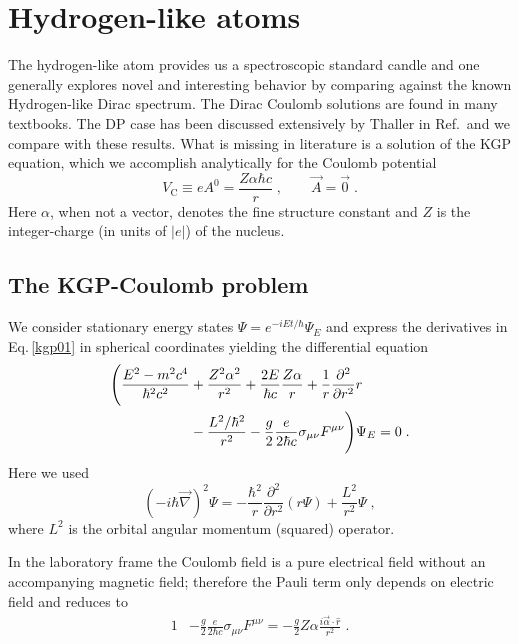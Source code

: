 \documentclass[epj]{svjour}
\begin{document}
\section{Hydrogen-like atoms} \label{cou}
The hydrogen-like atom provides us a spectroscopic standard candle and one generally explores novel and interesting behavior by comparing against the known Hydrogen-like Dirac spectrum. The Dirac Coulomb solutions are found in many textbooks. The DP case has been discussed extensively by Thaller in Ref.\,\cite{Thaller:1992ji} and we compare with these results. What is missing in literature is a solution of the KGP equation, which we accomplish analytically for the Coulomb potential 
\begin{equation}
\label{cou01} V_\mathrm{C}\equiv e A^{0}=\frac{Z \alpha\hbar c}{r}\;,\qquad \vec{A}=\vec{0}\;.
\end{equation}
Here $\alpha$, when not a vector, denotes the fine structure constant and $Z$ is the integer-charge (in units of $|e|$) of the nucleus. 

\subsection{The KGP-Coulomb problem}
We consider stationary energy states $\Psi=e^{-iEt/\hbar}\Psi_{E}$ and express the derivatives in Eq.\,\eqref{kgp01} in spherical coordinates yielding the differential equation
\begin{alignat}{1}
\label{cou02} \Bigg(\frac{E^{2}-m^{2}c^{4}}{\hbar^{2}c^{2}}&+\frac{Z^{2}\alpha^{2}}{r^{2}}+\frac{2E}{\hbar c}\frac{Z\alpha}{r}+\frac{1}{r}\frac{\partial^{2}}{\partial r^{2}}r\\ \notag &-\frac{L^{2}/\hbar^{2}}{r^{2}}-\frac{g}{2}\frac{e}{2\hbar c}\sigma_{\mu\nu}F^{\mu\nu}\Bigg)\Psi_{E}=0\;.
\end{alignat}
Here we used
\begin{equation}
(-i\hbar\vec{\nabla})^{2}\Psi=-\frac{\hbar^{2}}{r}\frac{\partial^{2}}{\partial r^{2}}(r\Psi)+\frac{L^{2}}{r^{2}}\Psi\;,
\end{equation}
where $L^{2}$ is the orbital angular momentum (squared) operator.

In the laboratory frame the Coulomb field is a pure electrical field without an accompanying magnetic field; therefore the Pauli term only depends on electric field and reduces to
\begin{alignat}{1}
\label{cou03} &-\frac{g}{2}\frac{e}{2\hbar c}\sigma_{\mu\nu}F^{\mu\nu}=-\frac{g}{2}Z\alpha\frac{i\vec{\alpha}\cdot\hat{r}}{r^{2}}\;.
\end{alignat}
\end{document}
